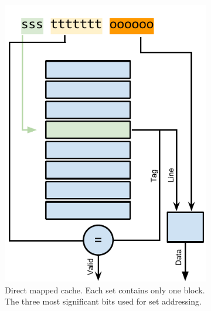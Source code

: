 \begin{figure}
    \centering
    \begin{subfigure}[b]{0.48\textwidth}
        \includegraphics[width=\textwidth]{figures/introduction/dircache_read}
        \caption{Direct mapped cache. Each set contains only one block. The three most significant bits used for set addressing.}
        \label{fig:introduction:cache:dir}
    \end{subfigure}%
    \begin{subfigure}[b]{0.48\textwidth}

\end{subfigure}
\end{figure}
